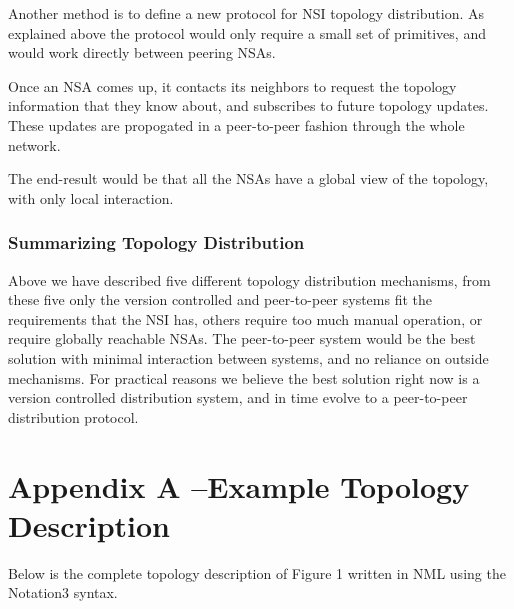 \documentclass{article}
\begin{document}
 Another method is to define a new protocol for NSI topology distribution. 
As explained above the protocol would only require a small set of primitives, and 
would work directly between peering NSAs.\label{h.jo1it2zr3py}


Once an NSA comes up, it contacts its neighbors to 
request the topology information that they know about, and subscribes to future 
topology updates. These updates are propogated in a peer-to-peer fashion through 
the whole network.\label{h.3qkmh8hazvti}


The end-result would be that all the NSAs have a 
global view of the topology, with only local interaction.\label{h.40nvr2if8zj}


\subsubsection{Summarizing Topology Distribution}

 Above we have described five different topology distribution mechanisms, 
from these five only the version controlled and peer-to-peer systems fit the requirements 
that the NSI has, others require too much manual operation, or require globally 
reachable NSAs. The peer-to-peer system would be the best solution with minimal 
interaction between systems, and no reliance on outside mechanisms. For practical 
reasons we believe the best solution right now is a version controlled distribution 
system, and in time evolve to a peer-to-peer distribution protocol.\label{h.j5x37xsutbrh}


\section*{Appendix A –Example Topology Description}

 Below is the complete topology description of Figure 1 written 
in NML using the Notation3 syntax.
\end{document}
